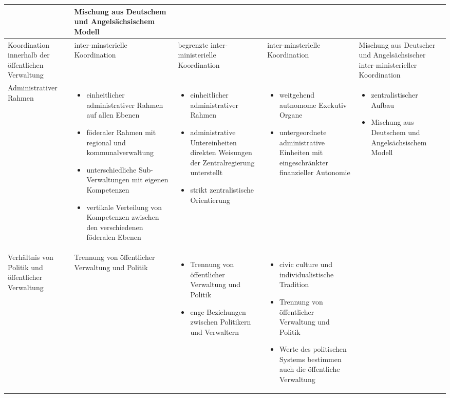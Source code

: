 \begin{landscape}
\begin{scriptsize}
\begin{longtable}[H]{|L{4cm}|L{5cm}|L{5cm}|L{5cm}|L{5cm}|}
\vspace{-1mm}
&
Mischung aus Deutschem und Angelsächsischem Modell\\\hline
Koordination innerhalb der öffentlichen Verwaltung	&inter-minsterielle Koordination	&begrenzte inter-ministerielle Koordination&	inter-minsterielle Koordination&	Mischung aus Deutscher und Angelsächsischer inter-ministerieller Koordination\\\hline
Administrativer Rahmen	&
 \vspace{-2mm}
\begin{itemize}
\item einheitlicher administrativer Rahmen auf allen Ebenen
\item föderaler Rahmen mit regional und kommunalverwaltung
\item unterschiedliche Sub-Verwaltungen mit eigenen Kompetenzen
\item vertikale Verteilung von Kompetenzen zwischen den verschiedenen föderalen Ebenen
 \vspace{-2mm}\end{itemize}

&
\begin{itemize}
\item einheitlicher administrativer Rahmen
\item administrative Untereinheiten direkten Weisungen der Zentralregierung unterstellt
\item strikt zentralistische Orientierung
\end{itemize}
&
\begin{itemize}
\item weitgehend autnomome Exekutiv Organe
\item untergeordnete administrative Einheiten mit eingeschränkter finanzieller Autonomie           
\end{itemize}
&
\begin{itemize}
\item zentralistischer Aufbau
\item Mischung aus Deutschem und Angelsächsischem Modell
\end{itemize}\\\hline
Verhältnis von Politik und öffentlicher Verwaltung&	Trennung von öffentlicher Verwaltung und Politik&
\begin{itemize}
\item Trennung von öffentlicher Verwaltung und Politik
\item enge Beziehungen zwischen Politikern und Verwaltern
\end{itemize}
&
 \vspace{-2mm}
\begin{itemize}
\item civic culture und individualistische Tradition
\item Trennung von öffentlicher Verwaltung und Politik
\item Werte des politischen Systems bestimmen auch die öffentliche Verwaltung
 \vspace{-2mm}
 \end{itemize}


\end{longtable}
\end{scriptsize}
\end{landscape}
